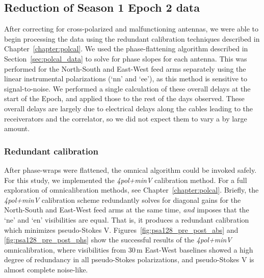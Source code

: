 \subsection{Reduction of Season 1 Epoch 2 data}
\label{subsec:psa128_s1e2_reduction}

After correcting for cross-polarized and malfunctioning antennas, we were able to begin processing the data using the redundant calibration techniques described in Chapter~\ref{chapter:polcal}. We used the phase-flattening algorithm described in Section~\ref{sec:polcal_data} to solve for phase slopes for each antenna. This was performed for the North-South and East-West feed arms separately using the linear instrumental polarizations (`nn' and `ee'), as this method is sensitive to signal-to-noise. We performed a single calculation of these overall delays at the start of the Epoch, and applied those to the rest of the days observed. These overall delays are largely due to electrical delays along the cables leading to the receiverators and the correlator, so we did not expect them to vary a by large amount.

\subsubsection{Redundant calibration}
\label{subsubsec:psa128_redcal}
After phase-wraps were flattened, the {\sc omnical} algorithm could be invoked safely. For this study, we implemented the \textit{4pol+minV} calibration method. For a full exploration of {\sc omnical}ibration methods, see Chapter~\ref{chapter:polcal}. Briefly, the \textit{4pol+minV} calibration scheme redundantly solves for diagonal gains for the North-South and East-West feed arms at the same time, \textit{and} imposes that the `ne' and `en' visibilities are equal. That is, it produces a redundant calibration which minimizes pseudo-Stokes V. Figures~\ref{fig:psa128_pre_post_abs} and \ref{fig:psa128_pre_post_phs} show the successful results of the \textit{4pol+minV} {\sc omnical}ibration, where visibilities from 30\,m East-West baselines showed a high degree of redundancy in all pseudo-Stokes polarizations, and pseudo-Stokes V is almost complete noise-like.

